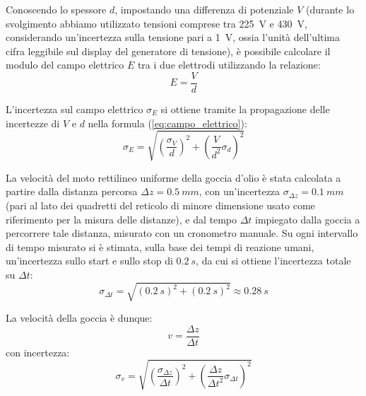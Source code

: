 \documentclass[a4paper,12pt]{article}
\begin{document}
Conoscendo lo spessore \( d \), impostando una differenza di potenziale \( V \) (durante lo svolgimento abbiamo utilizzato tensioni comprese tra \SI{225}{V} e \SI{430}{V}, considerando un'incertezza sulla tensione pari a \SI{1}{V}, ossia l'unità dell'ultima cifra leggibile sul display del generatore di tensione), è possibile calcolare il modulo del campo elettrico \( E \) tra i due elettrodi utilizzando la relazione:
\begin{equation}
E= \frac{V}{d}
\label{eq:campo_elettrico}
\end{equation}

L'incertezza sul campo elettrico \( \sigma_E \) si ottiene tramite la propagazione delle incertezze di \( V \) e \( d \) nella formula (\ref{eq:campo_elettrico}):
\begin{equation}
\sigma_E= \sqrt{\left( \frac{\sigma_V}{d} \right)^2+ \left( \frac{V}{d^2} \sigma_d \right)^2}
\label{eq:incertezza_E}
\end{equation}

La velocità del moto rettilineo uniforme della goccia d’olio è stata calcolata a partire dalla distanza percorsa \( \Delta z = \SI{0.5}{mm} \), con un'incertezza \( \sigma_{\Delta z} = \SI{0.1}{mm} \) (pari al lato dei quadretti del reticolo di minore dimensione usato come riferimento per la misura delle distanze), e dal tempo \( \Delta t \) impiegato dalla goccia a percorrere tale distanza, misurato con un cronometro manuale. Su ogni intervallo di tempo misurato si è stimata, sulla base dei tempi di reazione umani, un'incertezza sullo start e sullo stop di \( \SI{0.2}{s} \), da cui si ottiene l'incertezza totale su \( \Delta t \):
\begin{equation}
\sigma_{\Delta t}= \sqrt{(\SI{0.2}{s})^2+ (\SI{0.2}{s})^2} \approx \SI{0.28}{s}
\label{eq:incertezza_tempo}
\end{equation}

La velocità della goccia è dunque:
\begin{equation}
v= \frac{\Delta z}{\Delta t}
\label{eq:velocita_goccia}
\end{equation}
con incertezza:
\begin{equation}
\sigma_v= \sqrt{\left( \frac{\sigma_{\Delta z}}{\Delta t} \right)^2+ \left( \frac{\Delta z}{\Delta t^2} \sigma_{\Delta t} \right)^2}
\label{eq:incertezza_velocita}
\end{equation}
\end{document}
